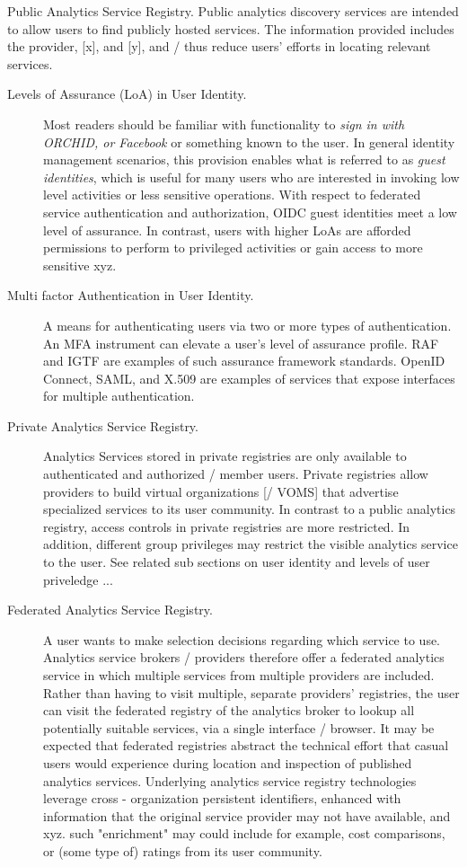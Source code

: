 Public Analytics Service Registry. Public analytics discovery
services are intended to allow users to find publicly hosted
services. The information provided includes the provider, [x], and
[y], and / thus reduce users' efforts in locating relevant services.

\begin{description}

\item[Levels of Assurance (LoA) in User Identity.] Most readers should
  be familiar with functionality to {\em sign in with ORCHID, or
    Facebook} or something known to the user. In general identity
  management scenarios, this provision enables what is referred to as
  {\em guest identities}, which is useful for many users who are
  interested in invoking low level activities or less sensitive
  operations. With respect to federated service authentication and
  authorization, OIDC guest identities meet a low level of
  assurance. In contrast, users with higher LoAs are afforded
  permissions to perform to privileged activities or gain access to
  more sensitive xyz.

\item[Multi factor Authentication in User Identity.] A means for
  authenticating users via two or more types of
  authentication. An MFA instrument can elevate a user's level of
  assurance profile. RAF and IGTF are examples of such assurance
  framework standards.  OpenID Connect, SAML, and X.509 are examples
  of services that expose interfaces for multiple authentication.

\item[Private Analytics Service Registry.] Analytics Services stored
  in private registries are only available to authenticated and
  authorized / member users. Private registries allow providers to
  build virtual organizations [/ VOMS] that advertise specialized
  services to its user community. In contrast to a public analytics
  registry, access controls in private registries are more
  restricted. In addition, different group privileges may restrict the
  visible analytics service to the user. See related sub sections on
  user identity and levels of user priveledge ...

\item[Federated Analytics Service Registry.] A user wants to make
  selection decisions regarding which service to use. Analytics
  service brokers / providers therefore offer a federated analytics
  service in which multiple services from multiple providers are
  included. Rather than having to visit multiple, separate providers'
  registries, the user can visit the federated registry of the
  analytics broker to lookup all potentially suitable services, via a
  single interface / browser. It may be expected that federated
  registries abstract the technical effort that casual users would
  experience during location and inspection of published analytics
  services.  Underlying analytics service registry technologies
  leverage cross - organization persistent identifiers, enhanced with
  information that the original service provider may not have
  available, and xyz. such "enrichment" may could include for example,
  cost comparisons, or (some type of) ratings from its user community.


\end{description}
